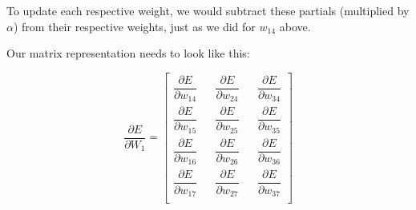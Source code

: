 \documentclass{article}
\begin{document}
To update each respective weight, we would subtract these partials (multiplied by $\alpha$) from their respective weights, just as we did for $w_{14}$ above.

Our matrix representation needs to look like this:

\renewcommand{\arraystretch}{2.5}
\[
\dfrac{\partial E}{\partial W_1} =
\begin{bmatrix}
    \dfrac{\partial E}{\partial w_{14}} && \dfrac{\partial E}{\partial w_{24}}  && \dfrac{\partial E}{\partial w_{34}}  \\
    \dfrac{\partial E}{\partial w_{15}} && \dfrac{\partial E}{\partial w_{25}}  && \dfrac{\partial E}{\partial w_{35}}  \\
    \dfrac{\partial E}{\partial w_{16}} && \dfrac{\partial E}{\partial w_{26}}  && \dfrac{\partial E}{\partial w_{36}}  \\
    \dfrac{\partial E}{\partial w_{17}} && \dfrac{\partial E}{\partial w_{27}}  && \dfrac{\partial E}{\partial w_{37}}  \\
\end{bmatrix}
\]
\renewcommand{\arraystretch}{1}
\end{document}

